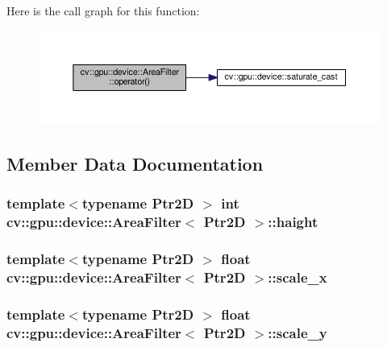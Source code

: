 Here is the call graph for this function\-:\nopagebreak
\begin{figure}[H]
\begin{center}
\leavevmode
\includegraphics[width=350pt]{structcv_1_1gpu_1_1device_1_1AreaFilter_aac27ed4875b34188ff0409fe26b5f5da_cgraph}
\end{center}
\end{figure}




\subsection{Member Data Documentation}
\hypertarget{structcv_1_1gpu_1_1device_1_1AreaFilter_a90e76ee923cf87a08e54847f12eaf089}{
\subsubsection[{haight}]{\setlength{\rightskip}{0pt plus 5cm}template$<$typename Ptr2\-D $>$ int {\bf cv\-::gpu\-::device\-::\-Area\-Filter}$<$ Ptr2\-D $>$\-::haight}}\label{structcv_1_1gpu_1_1device_1_1AreaFilter_a90e76ee923cf87a08e54847f12eaf089}
\hypertarget{structcv_1_1gpu_1_1device_1_1AreaFilter_ac0929ca79683b94cb33da45d7aba46ec}{
\subsubsection[{scale\-\_\-x}]{\setlength{\rightskip}{0pt plus 5cm}template$<$typename Ptr2\-D $>$ float {\bf cv\-::gpu\-::device\-::\-Area\-Filter}$<$ Ptr2\-D $>$\-::scale\-\_\-x}}\label{structcv_1_1gpu_1_1device_1_1AreaFilter_ac0929ca79683b94cb33da45d7aba46ec}
\hypertarget{structcv_1_1gpu_1_1device_1_1AreaFilter_ae7c124ce676b8620fb4de473ff83d7f6}{
\subsubsection[{scale\-\_\-y}]{\setlength{\rightskip}{0pt plus 5cm}template$<$typename Ptr2\-D $>$ float {\bf cv\-::gpu\-::device\-::\-Area\-Filter}$<$ Ptr2\-D $>$\-::scale\-\_\-y}}\label{structcv_1_1gpu_1_1device_1_1AreaFilter_ae7c124ce676b8620fb4de473ff83d7f6}
